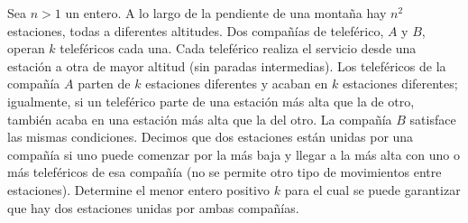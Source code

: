 Sea $n \gt 1$ un entero. A lo largo de la pendiente de una montaña hay $n^2$ estaciones, todas a diferentes altitudes. Dos compañías de teleférico, $A$ y $B$, operan $k$ teleféricos cada una. Cada teleférico realiza el servicio desde una estación a otra de mayor altitud (sin paradas intermedias). Los teleféricos de la compañía $A$ parten de $k$ estaciones diferentes y acaban en $k$ estaciones diferentes; igualmente, si un teleférico parte de una estación más alta que la de otro, también acaba en una estación más alta que la del otro. La compañía $B$ satisface las mismas condiciones. Decimos que dos estaciones están unidas por una compañía si uno puede comenzar por la más baja y llegar a la más alta con uno o más teleféricos de esa compañía (no se permite otro tipo de movimientos entre estaciones).
Determine el menor entero positivo $k$ para el cual se puede garantizar que hay dos estaciones unidas por ambas compañías.
